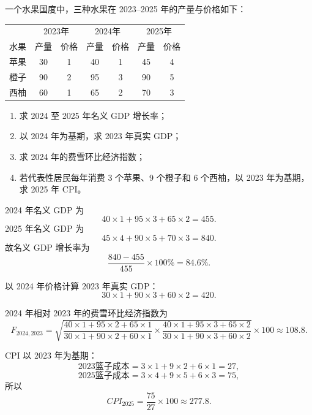 \begin{question}
一个水果国度中，三种水果在 2023--2025 年的产量与价格如下：
\begin{center}
\begin{tabular}{c|cc|cc|cc}
 & \multicolumn{2}{c|}{2023年} & \multicolumn{2}{c|}{2024年} & \multicolumn{2}{c}{2025年} \\
水果 & 产量 & 价格 & 产量 & 价格 & 产量 & 价格 \\\hline
苹果 & 30 & 1 & 40 & 1 & 45 & 4 \\
橙子 & 90 & 2 & 95 & 3 & 90 & 5 \\
西柚 & 60 & 1 & 65 & 2 & 70 & 3
\end{tabular}
\end{center}
\begin{enumerate}[label=(\alph*),leftmargin=2.5em]
  \item 求 2024 至 2025 年名义 GDP 增长率；
  \item 以 2024 年为基期，求 2023 年真实 GDP；
  \item 求 2024 年的费雪环比经济指数；
  \item 若代表性居民每年消费 3 个苹果、9 个橙子和 6 个西柚，以 2023 年为基期，求 2025 年 CPI。
\end{enumerate}
\begin{solution}
2024 年名义 GDP 为
\[
40\times1+95\times3+65\times2=455.
\]
2025 年名义 GDP 为
\[
45\times4+90\times5+70\times3=840.
\]
故名义 GDP 增长率为
\[
\frac{840-455}{455}\times 100\%=84.6\%.
\]

以 2024 年价格计算 2023 年真实 GDP：
\[
30\times1+90\times3+60\times2=420.
\]

2024 年相对 2023 年的费雪环比经济指数为
\[
F_{2024,2023}=\sqrt{\frac{40\times1+95\times2+65\times1}{30\times1+90\times2+60\times1}\times
\frac{40\times1+95\times3+65\times2}{30\times1+90\times3+60\times2}}\times 100
\approx 108.8.
\]

CPI 以 2023 年为基期：
\[
\text{2023篮子成本}=3\times1+9\times2+6\times1=27,
\]
\[
\text{2025篮子成本}=3\times4+9\times5+6\times3=75,
\]
所以
\[
CPI_{2025}=\frac{75}{27}\times 100\approx 277.8.
\]
\end{solution}
\end{question}

